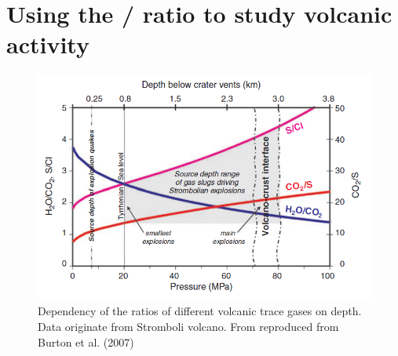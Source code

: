 \documentclass  [
  paper    = a4,
  BCOR     = 10mm,
  twoside,
  fontsize = 12pt,
  fleqn,
  toc      = bibnumbered,
  toc      = listofnumbered,
  numbers  = noendperiod,
  headings = normal,
  listof   = leveldown,
  version  = 3.03
]                                       {scrreprt}
\begin{document}
\section{Using the /  ratio to study volcanic activity}
\begin{figure}
	\centering
	\includegraphics[width=0.7\linewidth]{Zwischenbericht2018/Bilder/so2_bro}
	\caption{Dependency of the ratios of different volcanic trace gases on depth. Data originate from Stromboli volcano. From \cite{lubcke2014optical} reproduced from Burton et al. (2007)}
	\label{fig:so2bro}
\end{figure}    
	
\end{document}

